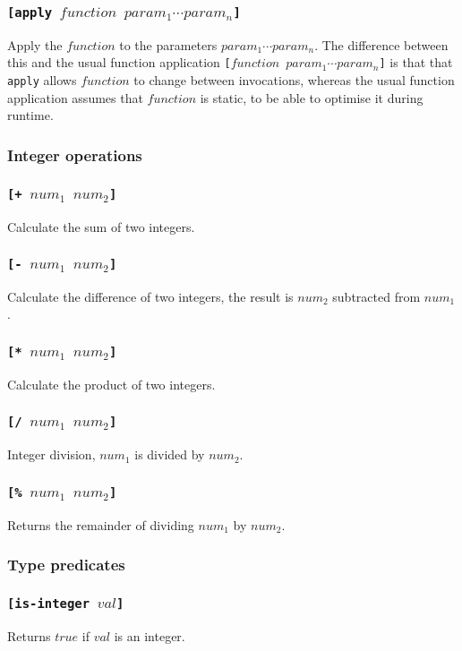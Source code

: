 \documentclass[11pt]{report}
\begin{document}
\subsubsection*{\tt{[apply }$function$ $param_1 \cdots param_n$\tt{]}}
Apply the $function$ to the parameters $param_1\cdots param_n$. The difference between this and the usual function application {\tt{[}$function$ $param_1\cdots param_n$\tt{]}} is that that \verb|apply| allows $function$ to change between invocations, whereas the usual function application assumes that $function$ is static, to be able to optimise it during runtime.

\subsubsection{Integer operations}
\subsubsection*{\tt{[+ }$num_1$ $num_2$\tt{]}}
Calculate the sum of two integers.
\subsubsection*{\tt{[- }$num_1$ $num_2$\tt{]}}
Calculate the difference of two integers, the result is $num_2$ subtracted from $num_1$.
\subsubsection*{\tt{[* }$num_1$ $num_2$\tt{]}}
Calculate the product of two integers.
\subsubsection*{\tt{[/ }$num_1$ $num_2$\tt{]}}
Integer division, $num_1$ is divided by $num_2$.
\subsubsection*{\tt{[\% }$num_1$ $num_2$\tt{]}}
Returns the remainder of dividing $num_1$ by $num_2$.

\subsubsection{Type predicates}
\subsubsection*{\tt{[is-integer }$val$\tt{]}}
Returns $true$ if $val$ is an integer.
\end{document}

